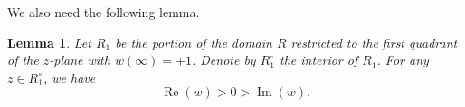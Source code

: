 \documentclass[11pt]{amsart}
\renewcommand{\Re}{\operatorname{Re}}
\renewcommand{\Im}{\operatorname{Im}}
\numberwithin{equation}{section}
\numberwithin{figure}{section}
\theoremstyle{plain} %
\newtheorem{lemma}[theorem]{Lemma}
\newtheorem{fact}[theorem]{Fact}
\theoremstyle{definition} %
\begin{document}
%
We also need the following lemma.

\begin{lemma}\label{lm:ReImw}
Let $R_1$ be the portion of the domain $R$ restricted to the first quadrant of the $z$-plane with $w(\infty)=+1$. 
Denote by $R_1^\circ$ the interior of $R_1$. 
For any $z\in R_1^\circ$, we have
\[
\Re(w)>0>\Im(w). 
\]
\end{lemma}
\end{document}
